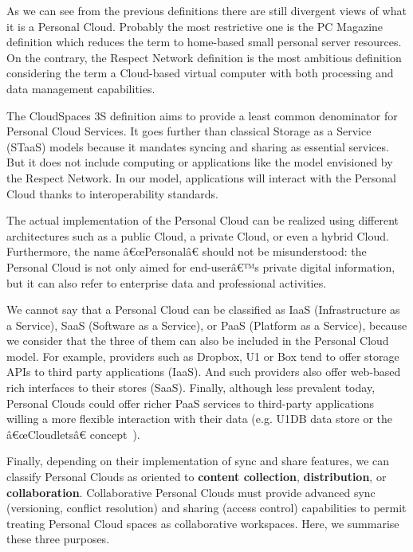 As we can see from the previous definitions there are still divergent views of what it is a Personal Cloud. Probably the most restrictive one is the PC Magazine definition which reduces the term to home-based small personal server resources.  On the contrary, the Respect Network definition is the most ambitious definition considering the term a Cloud-based virtual computer with both processing and data management capabilities. 

The CloudSpaces 3S definition aims to provide a least common denominator for Personal Cloud Services. It goes further than classical Storage as a Service (STaaS) models because it mandates syncing and sharing as essential services. But it does not include computing or applications like the model envisioned by the Respect Network. In our model, applications will interact with the Personal Cloud thanks to interoperability standards.



The actual implementation of the Personal Cloud can be realized using different architectures such as a public Cloud, a private Cloud, or even a hybrid Cloud. Furthermore, the name â€œPersonalâ€ should not be misunderstood: the Personal Cloud is not only aimed for end-userâ€™s private digital information, but it can also refer to enterprise data and professional activities.


We cannot say that a Personal Cloud can be classified as  IaaS (Infrastructure as a Service), SaaS (Software as a Service), or PaaS (Platform as a Service), because we consider that the three of them can also be included in the Personal Cloud model. For example, providers such as Dropbox, U1 or Box tend to offer storage APIs to third party applications (IaaS). And such providers also offer web-based rich interfaces to their stores (SaaS). Finally, although less prevalent today, Personal Clouds could offer richer PaaS services to third-party applications willing a more flexible interaction with their data (e.g. U1DB data store or the â€œCloudletsâ€ concept~\cite{openi}).


Finally, depending on their implementation of sync and share features, we can classify Personal Clouds as oriented to \textbf{content collection},  \textbf{distribution}, or  \textbf{collaboration}. Collaborative Personal Clouds must provide advanced sync (versioning, conflict resolution) and sharing (access  control) capabilities to permit treating Personal Cloud spaces as collaborative workspaces. Here, we summarise these three purposes.

